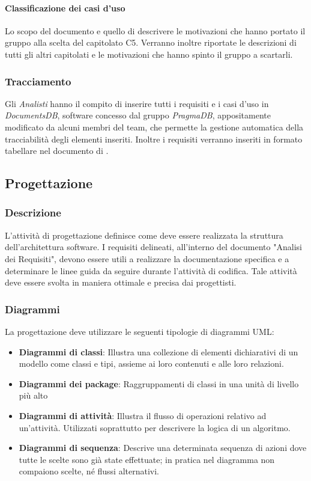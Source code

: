 \paragraph{Classificazione dei casi d'uso}
Lo scopo del documento e quello di descrivere le motivazioni che hanno portato il gruppo alla scelta del capitolato C5.
Verranno inoltre riportate le descrizioni di tutti gli altri capitolati e le motivazioni che hanno spinto il gruppo a scartarli.

\subsubsection{Tracciamento}
Gli \textsl{Analisti} hanno il compito di inserire tutti i requisiti e i casi d'uso in \textsl{DocumentsDB},
software concesso dal gruppo \textsl{PragmaDB}, appositamente modificato da alcuni membri del 
team, che permette la gestione automatica della tracciabilità degli elementi inseriti. 
Inoltre i requisiti verranno inseriti in formato tabellare nel documento di \textsl{\AdR}.
\subsection{Progettazione}


\subsubsection{Descrizione}
L'attività di progettazione definisce come deve essere realizzata la struttura dell'architettura software. I requisiti delineati, all'interno del documento "Analisi dei Requisiti", devono essere utili a realizzare la documentazione specifica e a determinare le linee guida da seguire durante l'attività di codifica. 
Tale attività deve essere svolta in maniera ottimale e precisa dai progettisti.  
  
\subsubsection{Diagrammi}
La progettazione deve utilizzare le seguenti tipologie di diagrammi UML:
\begin{itemize} 
\item
\textbf{Diagrammi di classi}: Illustra una collezione di elementi dichiarativi di un modello come classi e tipi, assieme ai loro contenuti e alle loro relazioni.  
\item
\textbf{Diagrammi dei package}: Raggruppamenti di classi in una unità di livello più alto
\item
\textbf{Diagrammi di attività}: Illustra il flusso di operazioni relativo ad un'attività. Utilizzati soprattutto per descrivere la logica di un algoritmo.  
\item
\textbf{Diagrammi di sequenza}: Descrive una determinata sequenza di azioni dove tutte le scelte sono già state effettuate; in pratica nel diagramma non compaiono scelte, né flussi alternativi.
\end{itemize}


